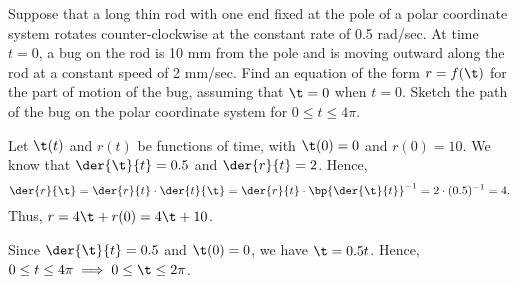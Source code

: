 \begin{problem}
    Suppose that a long thin rod with one end fixed at the pole of a polar coordinate system rotates counter-clockwise at the constant rate of 0.5 rad/sec. At time $t = 0$, a bug on the rod is 10 mm from the pole and is moving outward along the rod at a constant speed of 2 mm/sec. Find an equation of the form $r = f(\t)$ for the part of motion of the bug, assuming that $\t = 0$ when $t = 0$. Sketch the path of the bug on the polar coordinate system for $0 \leq t \leq 4\pi$.
\end{problem}
\begin{solution}
    Let $\t(t)$ and $r(t)$ be functions of time, with $\t(0) = 0$ and $r(0) = 10$. We know that $\der{\t}{t} = 0.5$ and $\der{r}{t} = 2$. Hence, \[\der{r}{\t} = \der{r}{t} \cdot \der{t}{\t} = \der{r}{t} \cdot \bp{\der{\t}{t}}^{-1} = 2 \cdot (0.5)^{-1} = 4.\] Thus, $r = 4\t + r(0) = 4\t + 10$.

    Since $\der{\t}{t} = 0.5$ and $\t(0) = 0$, we have $\t = 0.5t$. Hence, $0 \leq t \leq 4\pi \implies 0 \leq \t \leq 2\pi$.

    \begin{center}
    \end{center}
\end{solution}

